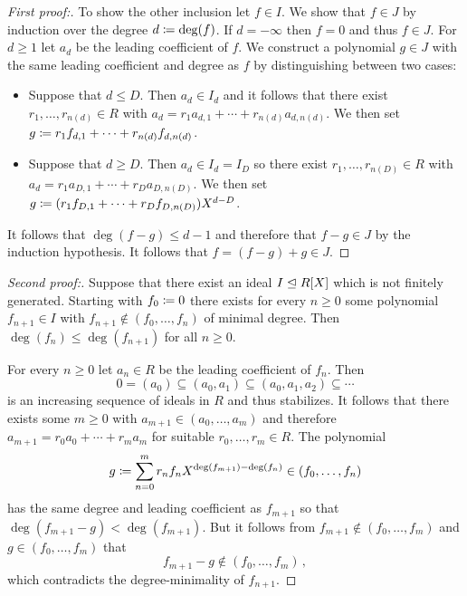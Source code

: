 \begin{proof}[First proof:]
  To show the other inclusion let $f \in I$.
  We show that $f \in J$ by induction over the degree $d \coloneqq \deg(f)$.
  If $d = -\infty$ then $f = 0$ and thus $f \in J$.
  For $d \geq 1$ let $a_d$ be the leading coefficient of $f$.
  We construct a polynomial $g \in J$ with the same leading coefficient and degree as $f$ by distinguishing between two cases:
  \begin{itemize}
    \item
      Suppose that $d \leq D$.
      Then $a_d \in I_d$ and it follows that there exist $r_1, \dotsc, r_{n(d)} \in R$ with $a_d = r_1 a_{d,1} + \dotsb + r_{n(d)} a_{d,n(d)}$.
      We then set $g \coloneqq r_1 f_{d,1} + \dotsb + r_{n(d)} f_{d,n(d)}$.
    \item
      Suppose that $d \geq D$.
      Then $a_d \in I_d = I_D$ so there exist $r_1, \dotsc, r_{n(D)} \in R$ with $a_d = r_1 a_{D,1} + \dotsb + r_D a_{D, n(D)}$.
      We then set $g \coloneqq (r_1 f_{D,1} + \dotsb + r_D f_{D,n(D)}) X^{d-D}$.
  \end{itemize}
  It follows that $\deg(f - g) \leq d - 1$ and therefore that $f - g \in J$ by the induction hypothesis.
  It follows that $f = (f - g) + g \in J$.
\end{proof}


\begin{proof}[Second proof:]
  Suppose that there exist an ideal $I \trianglelefteq R[X]$ which is not finitely generated.
  Starting with $f_0 \coloneqq 0$ there exists for every $n \geq 0$ some polynomial $f_{n+1} \in I$ with $f_{n+1} \notin (f_0, \dotsc, f_n)$ of minimal degree.
  Then $\deg(f_n) \leq \deg(f_{n+1})$ for all $n \geq 0$.
  
  For every $n \geq 0$ let $a_n \in R$ be the leading coefficient of $f_n$.
  Then
  \[
              0
    =         (a_0)
    \subseteq (a_0, a_1)
    \subseteq (a_0, a_1, a_2)
    \subseteq \dotsb
  \]
  is an increasing sequence of ideals in $R$ and thus stabilizes.
  It follows that there exists some $m \geq 0$ with $a_{m+1} \in (a_0, \dotsc, a_m)$ and therefore $a_{m+1} = r_0 a_0 + \dotsb + r_m a_m$ for suitable $r_0, \dotsc, r_m \in R$.
  The polynomial
  \[
              g
    \coloneqq  \sum_{n=0}^m r_n f_n X^{\deg(f_{m+1}) - \deg(f_n)}
    \in       (f_0, \dotsc, f_n)
  \]
  has the same degree and leading coefficient as $f_{m+1}$ so that $\deg(f_{m+1} - g) < \deg(f_{m+1})$.
  But it follows from $f_{m+1} \notin (f_0, \dotsc, f_m)$ and $g \in (f_0, \dotsc, f_m)$ that
  \[
            f_{m+1} - g
    \notin  (f_0, \dotsc, f_m) \,,
  \]
  which contradicts the degree-minimality of $f_{n+1}$.
\end{proof}


